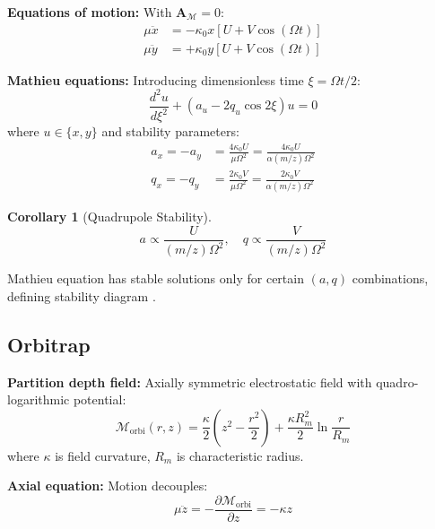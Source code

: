 \documentclass[twocolumn,10pt]{revtex4-2}
\newtheorem{corollary}[theorem]{Corollary}
\theoremstyle{definition}
\theoremstyle{remark}
\newcommand{\Mdepth}{\mathcal{M}}
\newcommand{\Apartition}{\mathbf{A}_{\Mdepth}}
\newcommand{\partinert}{\mu}
\begin{document}
\textbf{Equations of motion:} With $\Apartition = 0$:
\begin{align}
\partinert\ddot{x} &= -\kappa_0 x[U + V\cos(\Omega t)] \label{eq:quad_x} \\
\partinert\ddot{y} &= +\kappa_0 y[U + V\cos(\Omega t)] \label{eq:quad_y}
\end{align}

\textbf{Mathieu equations:} Introducing dimensionless time $\xi = \Omega t/2$:
\begin{equation}
\frac{d^2 u}{d\xi^2} + (a_u - 2q_u\cos 2\xi)u = 0
\label{eq:mathieu}
\end{equation}
where $u \in \{x, y\}$ and stability parameters:
\begin{align}
a_x = -a_y &= \frac{4\kappa_0 U}{\partinert\Omega^2} = \frac{4\kappa_0 U}{\alpha(m/z)\Omega^2} \label{eq:a_param} \\
q_x = -q_y &= \frac{2\kappa_0 V}{\partinert\Omega^2} = \frac{2\kappa_0 V}{\alpha(m/z)\Omega^2} \label{eq:q_param}
\end{align}

\begin{corollary}[Quadrupole Stability]
\begin{equation}
\boxed{a \propto \frac{U}{(m/z)\Omega^2}, \quad q \propto \frac{V}{(m/z)\Omega^2}}
\end{equation}
\end{corollary}

\noindent Mathieu equation has stable solutions only for certain $(a, q)$ combinations, defining stability diagram \cite{Paul1990}.

\subsection{Orbitrap}

\textbf{Partition depth field:} Axially symmetric electrostatic field with quadro-logarithmic potential:
\begin{equation}
\Mdepth_{\mathrm{orbi}}(r, z) = \frac{\kappa}{2}\left(z^2 - \frac{r^2}{2}\right) + \frac{\kappa R_m^2}{2}\ln\frac{r}{R_m}
\label{eq:orbitrap_field}
\end{equation}
where $\kappa$ is field curvature, $R_m$ is characteristic radius.

\textbf{Axial equation:} Motion decouples:
\begin{equation}
\partinert\ddot{z} = -\frac{\partial \Mdepth_{\mathrm{orbi}}}{\partial z} = -\kappa z
\label{eq:orbitrap_axial}
\end{equation}
\end{document}

